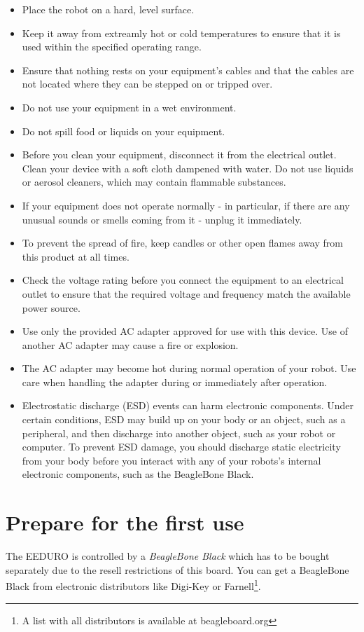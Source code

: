 \begin{itemize}
 \item Place the robot on a hard, level surface.
 \item Keep it away from extreamly hot or cold temperatures to ensure that it is used within the specified operating range.
 \item Ensure that nothing rests on your equipment's cables and that the cables are not located where they can be stepped on or tripped over.
 \item Do not use your equipment in a wet environment.
 \item Do not spill food or liquids on your equipment.
 \item Before you clean your equipment, disconnect it from the electrical outlet. Clean your device with a soft cloth dampened with water. Do not use liquids or aerosol cleaners, which may contain flammable substances.
 \item If your equipment does not operate normally - in particular, if there are any unusual sounds or smells coming from it - unplug it immediately.
 \item To prevent the spread of fire, keep candles or other open flames away from this product at all times.
 \item Check the voltage rating before you connect the equipment to an electrical outlet to ensure that the required voltage and frequency match the available power source.
 \item Use only the provided AC adapter approved for use with this device. Use of another AC adapter may cause a fire or explosion.
 \item The AC adapter may become hot during normal operation of your robot. Use care when handling the adapter during or immediately after operation.
 \item Electrostatic discharge (ESD) events can harm electronic components. Under certain conditions, ESD may build up on your body or an object, such as a peripheral, and then discharge into another object, such as your robot or computer. To prevent ESD damage, you should discharge static electricity from your body before you interact with any of your robots’s internal electronic components, such as the BeagleBone Black.
\end{itemize}

\section{Prepare for the first use}
The EEDURO is controlled by a \textit{BeagleBone Black} which has to be bought separately due to the resell restrictions of this board. You can get a BeagleBone Black from electronic distributors like Digi-Key or Farnell\footnote{A list with all distributors is available at beagleboard.org}.

